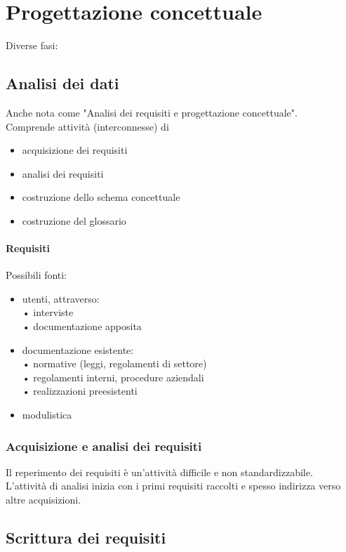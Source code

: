 \chapter{Progettazione concettuale}
Diverse fasi:
\section{Analisi dei dati}
Anche nota come "Analisi dei requisiti e progettazione concettuale".
\\Comprende attività (interconnesse) di
\begin{itemize}
    \item acquisizione dei requisiti
    \item analisi dei requisiti
    \item costruzione dello schema concettuale
    \item costruzione del glossario
\end{itemize}

\subsubsection{Requisiti}
Possibili fonti:
\begin{itemize}
    \item utenti, attraverso:
    \\• interviste
    \\• documentazione apposita
    \item documentazione esistente:
    \\• normative (leggi, regolamenti di settore)
    \\• regolamenti interni, procedure aziendali
    \\• realizzazioni preesistenti
    \item modulistica
\end{itemize}

\subsection{Acquisizione e analisi dei requisiti}
Il reperimento dei requisiti è un'attività difficile e non standardizzabile.
\\L'attività di analisi inizia con i primi requisiti raccolti e spesso indirizza verso altre acquisizioni.


\section{Scrittura dei requisiti}

